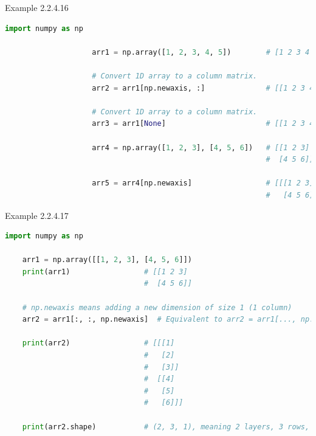 \documentclass{book}
\begin{document}
\newpage
\begin{egBox}{Example 2.2.4.16}{}
    \begin{lstlisting}[language=Python, basicstyle=\ttfamily\small, keywordstyle=\color{blue}, commentstyle=\color{forestgreen}, stringstyle=\color{red}, showstringspaces=false]
                    import numpy as np
                    
                    arr1 = np.array([1, 2, 3, 4, 5])        # [1 2 3 4 5]
                    
                    # Convert 1D array to a column matrix.
                    arr2 = arr1[np.newaxis, :]              # [[1 2 3 4 5]]

                    # Convert 1D array to a column matrix.
                    arr3 = arr1[None]                       # [[1 2 3 4 5]]

                    arr4 = np.array([1, 2, 3], [4, 5, 6])   # [[1 2 3]
                                                            #  [4 5 6]]

                    arr5 = arr4[np.newaxis]                 # [[[1 2 3]
                                                            #   [4 5 6]]]
    \end{lstlisting}
\end{egBox}
\begin{egBox}{Example 2.2.4.17}{}
    \begin{lstlisting}[language=Python, basicstyle=\ttfamily\small, keywordstyle=\color{blue}, commentstyle=\color{forestgreen}, stringstyle=\color{red}, showstringspaces=false]
    import numpy as np

    arr1 = np.array([[1, 2, 3], [4, 5, 6]])
    print(arr1)                 # [[1 2 3]
                                #  [4 5 6]]

    # np.newaxis means adding a new dimension of size 1 (1 column)
    arr2 = arr1[:, :, np.newaxis]  # Equivalent to arr2 = arr1[..., np.newaxis]

    print(arr2)                 # [[[1]
                                #   [2]
                                #   [3]]
                                #  [[4]
                                #   [5]
                                #   [6]]]

    print(arr2.shape)           # (2, 3, 1), meaning 2 layers, 3 rows, 1 column
    \end{lstlisting}
\end{egBox}
\end{document}
